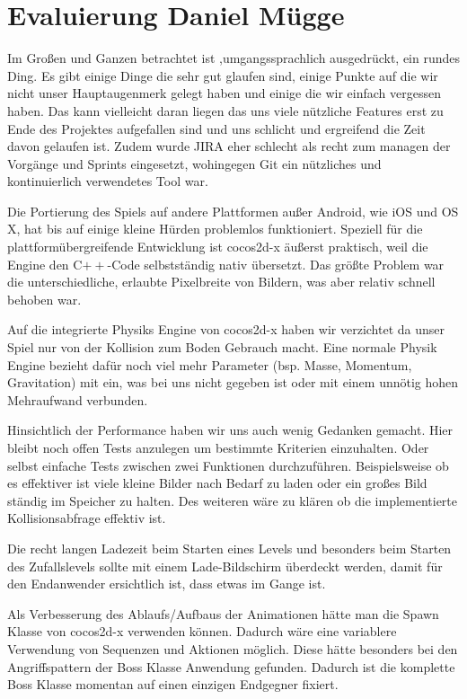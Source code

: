 \chapter[Evaluierung]{Evaluierung \small Daniel Mügge}\label{ch:eval}

Im Großen und Ganzen betrachtet ist \gamename ,umgangssprachlich ausgedrückt, ein rundes Ding.
Es gibt einige Dinge die sehr gut glaufen sind, einige Punkte auf die wir nicht unser Hauptaugenmerk gelegt haben und einige die wir einfach vergessen haben. Das kann vielleicht daran liegen das uns viele nützliche Features erst zu Ende des Projektes aufgefallen sind und uns schlicht und ergreifend die Zeit davon gelaufen ist. Zudem wurde JIRA eher schlecht als recht zum managen der Vorgänge und Sprints eingesetzt, wohingegen Git ein nützliches und kontinuierlich verwendetes Tool war.

Die Portierung des Spiels auf andere Plattformen außer Android, wie iOS und OS X, hat bis auf einige kleine Hürden problemlos funktioniert. Speziell für die plattformübergreifende Entwicklung ist cocos2d-x äußerst praktisch, weil die Engine den C$++$-Code selbstständig nativ übersetzt.
Das größte Problem war die unterschiedliche, erlaubte Pixelbreite von Bildern, was aber relativ schnell behoben war.

Auf die integrierte Physiks Engine von cocos2d-x haben wir verzichtet da unser Spiel nur von der Kollision zum Boden Gebrauch macht. Eine normale Physik Engine bezieht dafür noch viel mehr Parameter (bsp. Masse, Momentum, Gravitation) mit ein, was bei uns nicht gegeben ist oder mit einem unnötig hohen Mehraufwand verbunden.

Hinsichtlich der Performance haben wir uns auch wenig Gedanken gemacht. Hier bleibt noch offen Tests anzulegen um bestimmte Kriterien einzuhalten. Oder selbst einfache Tests zwischen zwei Funktionen durchzuführen. Beispielsweise ob es effektiver ist viele kleine Bilder nach Bedarf zu laden oder ein großes Bild ständig im Speicher zu halten. Des weiteren wäre zu klären ob die implementierte Kollisionsabfrage effektiv ist.

Die recht langen Ladezeit beim Starten eines Levels und besonders beim Starten des Zufallslevels sollte mit einem Lade-Bildschirm überdeckt werden, damit für den Endanwender ersichtlich ist, dass etwas im Gange ist.

Als Verbesserung des Ablaufs/Aufbaus der Animationen hätte man die Spawn Klasse von cocos2d-x verwenden können. Dadurch wäre eine variablere Verwendung von Sequenzen und Aktionen möglich. Diese hätte besonders bei den Angriffspattern der Boss Klasse Anwendung gefunden. Dadurch ist die komplette Boss Klasse momentan auf einen einzigen Endgegner fixiert.

